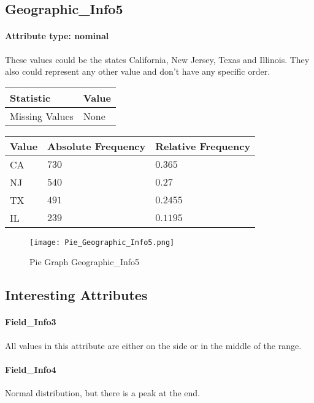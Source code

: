 \subsection{Geographic\_Info5}
\paragraph{Attribute type: nominal} These values could be the states California, New Jersey, Texas and Illinois. They also could represent any other value and don't have any specific order.

\begin{table}[H]
	\renewcommand{\arraystretch}{1.25}
	\begin{tabular}{l|l}
		\textbf{Statistic} & \textbf{Value}\\\hline
		Missing Values& None\\\hline
	\end{tabular}
\end{table}
\begin{table}[H]
	\renewcommand{\arraystretch}{1.25}
	\begin{tabular}{l|l|l}
		\textbf{Value} & \textbf{Absolute Frequency} & \textbf{Relative Frequency}\\\hline
		CA&$730$&$0.365$\\\hline
		NJ&$540$&$0.27$\\\hline
		TX&$491$&$0.2455$\\\hline
		IL&$239$&$0.1195$
	\end{tabular}
\end{table}

\begin{figure}[H]
	\begin{center}
		\texttt{[image: Pie\_Geographic\_Info5.png]}
	\end{center}
	\caption{Pie Graph Geographic\_Info5}
\end{figure}

\subsection{Interesting Attributes}

\paragraph{Field\_Info3} All values in this attribute are either on the side or in the middle of the range. 

\paragraph{Field\_Info4} Normal distribution, but there is a peak at the end.

